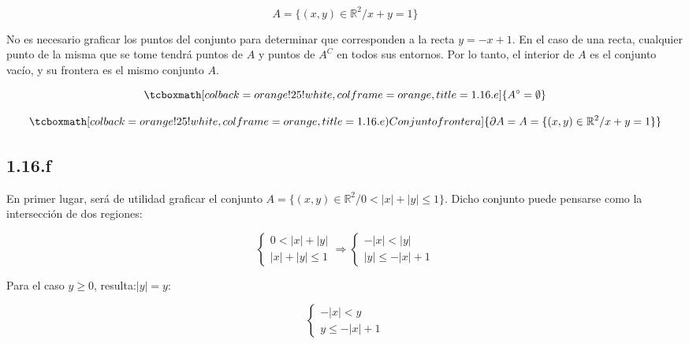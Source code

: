 \documentclass{article}
\renewcommand{\Bbb}{\mathbb}
\begin{document}
\begin{equation}
A = \{ (x, y) \in \Bbb R^2 / x + y = 1 \}
\end{equation}

No es necesario graficar los puntos del conjunto para determinar que corresponden a la recta $y = -x + 1$. En el caso de una recta, cualquier punto de la misma que se tome tendrá puntos de $A$ y puntos de $A^C$ en todos sus entornos. Por lo tanto, el interior de $A$ es el conjunto vacío, y su frontera es el mismo conjunto $A$.

\begin{equation}
\tcboxmath[colback=orange!25!white,colframe=orange,title=1.16.e]
{ A^{\circ} = \emptyset }
\end{equation}

\begin{equation}
\tcboxmath[colback=orange!25!white,colframe=orange,title=1.16.e) Conjunto frontera]
{ \partial{A} = A = \{ (x, y) \in \Bbb R^2 / x + y = 1 \} }
\end{equation}

\subsection*{1.16.f}
\label{subsec:1.16.f}

En primer lugar, será de utilidad graficar el conjunto $A = \{ (x,y) \in \Bbb R^2 / 0 < |x| + |y| \leq 1 \}$. Dicho conjunto puede pensarse como la intersección de dos regiones:

\begin{equation}
\left\{
\begin{array}{ll}
0 < |x| + |y| \\
|x| + |y| \leq 1
\end{array}
\right. \Rightarrow
\left\{
\begin{array}{ll}
-|x| < |y| \\
|y| \leq -|x| + 1
\end{array}
\right.
\end{equation}

Para el caso $y \geq 0$, resulta:$|y| = y$:

\begin{equation}
\left\{
\begin{array}{ll}
-|x| < y \\
y \leq -|x| + 1
\end{array}
\right.
\end{equation}
\end{document}
